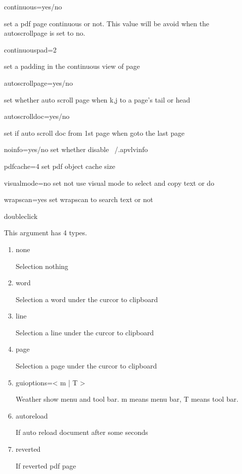\documentclass[a4paper,12pt]{article}
\begin{document}
\begin{description}
\item continuous=yes/no

set a pdf page continuous or not. This value will be avoid when the autoscrollpage is set to no.

\item continuouspad=2

set a padding in the continuous view of page

\item autoscrollpage=yes/no

set whether auto scroll page when k,j to a page's tail or head

\item autoscrolldoc=yes/no

set if auto scroll doc from 1st page when goto the last page

\item noinfo=yes/no
set whether disable ~/.apvlvinfo

\item pdfcache=4
set pdf object cache size

\item visualmode=no
set not use visual mode to select and copy text or do

\item wrapscan=yes
set wrapscan to search text or not

\item doubleclick

This argument has 4 types.

\begin{enumerate}

\item none

Selection nothing

\item word

Selection a word under the curcor to clipboard

\item line

Selection a line under the curcor to clipboard

\item page

Selection a page under the curcor to clipboard

\item guioptions=< m | T >

Weather show menu and tool bar. m means menu bar, T means tool bar.

\item autoreload

If auto reload document after some seconds

\item reverted

If reverted pdf page

\end{enumerate}

\end{description}
\end{document}
